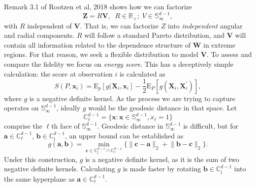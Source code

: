 \documentclass[20pt, a0paper, landscape,colspace=0.8cm,blockverticalspace=0.8cm,innermargin=0.8cm]{tikzposter}
\begin{document}
\begin{columns}
{        \vspace{1cm}
        Remark 3.1 of Rootzen et al, 2018 shows how %
        we can factorize \[\bm{Z} =
            R\bm{V},\;\;R\in\mathbb{R}_+;\;V\in\mathbb{S}_{\infty}^{d-1},\]
        with $R$ independent of $\bm{V}$. 
        That is, we can factorize $Z$ into
        \emph{independent} angular and radial components. $R$ will follow
        a standard Pareto distribution, and $\bm{V}$ will contain all 
        information related to the dependence structure of $\bm{W}$ in extreme
        regions.  For that reason, we seek a flexible distribution to model
        $\bm{V}$.
        }
    {
    To assess and compare the fidelity we focus on \emph{energy score}.  This has a deceptively simple calculation: the score at observation $i$ is calculated as
    \[
        S(P,\bm{x}_i) = \text{E}_p\left[g(\bm{X}_i,\bm{x}_i\right] -
        \frac{1}{2}\text{E}_P\left[g(\bm{X}_i,\bm{X}_i^{\prime})\right],
    \]
    where $g$ is a negative definite kernel.  As the process we are trying to capture operates 
    on $\mathbb{S}_{\infty}^{d-1}$, ideally $g$ would be the geodesic distance in
    that space. Let \[\mathbb{C}_\ell^{d-1} = \lbrace
    \bm{x} : \bm{x} \in \mathbb{S}_{\infty}^{d-1}, x_{\ell} = 1\rbrace\] comprise the $\ell$th
    face of $\mathbb{S}_{\infty}^{d-1}$.  Geodesic distance in
    $\mathbb{S}_{\infty}^{d-1}$ is difficult, but for
    $\bm{a}\in\mathbb{C}_{\ell}^{d-1}$, $\bm{b}\in\mathbb{C}_{\jmath}^{d-1}$, 
    an upper bound can be established as
    \[
        g(\bm{a},\bm{b}) = \min\limits_{\bm{c}\in\mathbb{C}_{\jmath}^{d-1}\cap\mathbb{C}_{\ell}^{d-1}}\lbrace\lVert \bm{c} - \bm{a}\rVert_2 + \lVert \bm{b} - \bm{c}\rVert_2\rbrace.
    \]
    Under this construction, $g$ is a negative definite kernel, as it is the sum of two 
    negative definite kernels.  Calculating $g$ is made faster by rotating 
    $\bm{b}\in\mathbb{C}_{\jmath}^{d-1}$ into the same hyperplane as $\bm{a}\in\mathbb{C}_{\ell}^{d-1}$.
    }
    

\end{columns}
\end{document}
